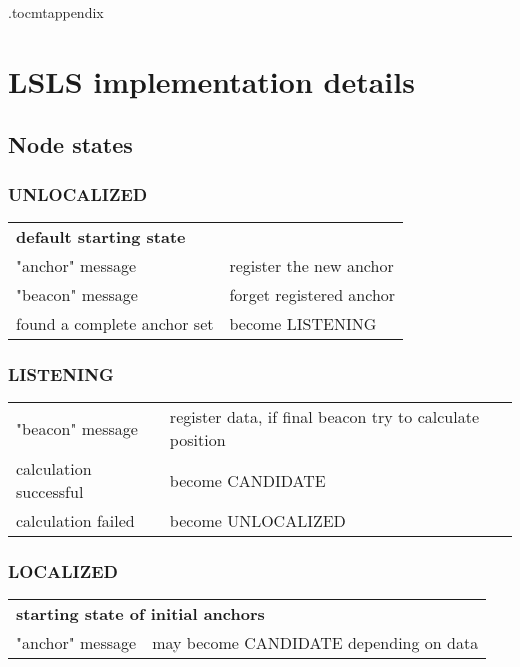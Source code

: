 \documentclass[12pt,a4paper,fleqn]{report}
\begin{document}
\begin{appendices}

\etocdepthtag.toc{mtappendix}
\tableofcontents‎‎

\chapter{LSLS implementation details}
\label{appendix:lsls}

\section*{Node states}

\subsection*{UNLOCALIZED}

\begin{tabular}{p{5cm}l}
	\multicolumn{2}{l}{\textbf{default starting state}} \\
	"anchor" message	& register the new anchor \\
	"beacon" message	& forget registered anchor \\
	found a complete anchor set	& become LISTENING
\end{tabular}

\subsection*{LISTENING}

\begin{tabular}{p{5cm}l}
	"beacon" message	& register data, if final beacon try to calculate position \\
	calculation successful	& become CANDIDATE \\
	calculation failed		& become UNLOCALIZED
\end{tabular}

\subsection*{LOCALIZED}

\begin{tabular}{p{5cm}l}
	\multicolumn{2}{l}{\textbf{starting state of initial anchors}} \\
	"anchor" message	& may become CANDIDATE depending on data \\
\end{tabular}


\end{appendices}
\end{document}
